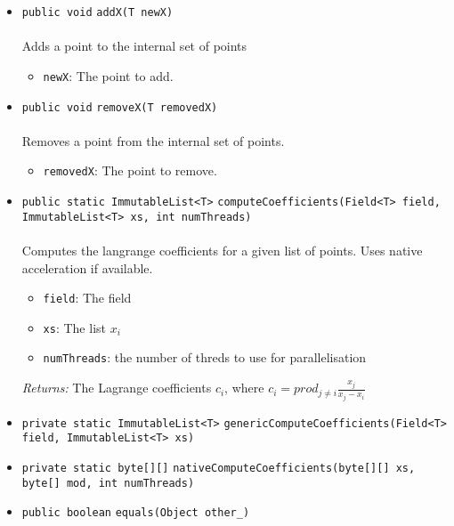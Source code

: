 \begin{itemize}
\item \lstinline|public void| \lstinline|addX|\lstinline|(T newX)|\\ \\[-0.6em]
Adds a point to the internal set of points
\begin{itemize}
\item \lstinline|newX|: The point to add.
\end{itemize}



\item \lstinline|public void| \lstinline|removeX|\lstinline|(T removedX)|\\ \\[-0.6em]
Removes a point from the internal set of points.
\begin{itemize}
\item \lstinline|removedX|: The point to remove.
\end{itemize}



\item \lstinline|public static ImmutableList<T>| \lstinline|computeCoefficients|\lstinline|(Field<T> field, ImmutableList<T> xs, int numThreads)|\\ \\[-0.6em]
Computes the langrange coefficients for a given list of points.
 Uses native acceleration if available.
\begin{itemize}
\item \lstinline|field|: The field
\item \lstinline|xs|: The list $x_i$
\item \lstinline|numThreads|: the number of threds to use for parallelisation
\end{itemize}

\emph{Returns:} The Lagrange coefficients $c_i$,
         where $c_i = prod_{j \neq i} \frac{x_j}{x_j - x_i}$

\item \lstinline|private static ImmutableList<T>| \lstinline|genericComputeCoefficients|\lstinline|(Field<T> field, ImmutableList<T> xs)| \\[-0.6em]




\item \lstinline|private static byte[][]| \lstinline|nativeComputeCoefficients|\lstinline|(byte[][] xs, byte[] mod, int numThreads)| \\[-0.6em]




\item \lstinline|public boolean| \lstinline|equals|\lstinline|(Object other_)| \\[-0.6em]




\end{itemize}

